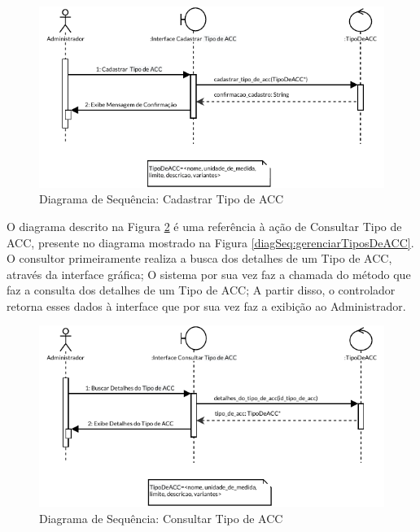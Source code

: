 \begin{figure}[H]
    \centering
    \includegraphics[width=\textwidth]{dados/figuras/Proposta/DiagramasDeSequencia/Gerenciar Tipos de ACC-Cadastrar Tipo de ACC.pdf}
    \caption{Diagrama de Sequência: Cadastrar Tipo de ACC}
    \label{diagSeq:cadastrarTipoDeACC}
\end{figure}

O diagrama descrito na Figura \ref{diagSeq:consultarTipoDeACC} é uma referência à ação de Consultar Tipo de ACC, presente no diagrama mostrado na Figura \ref{diagSeq:gerenciarTiposDeACC}. O consultor primeiramente realiza a busca dos detalhes de um Tipo de ACC, através da interface gráfica; O sistema por sua vez faz a chamada do método que faz a consulta dos detalhes de um Tipo de ACC; A partir disso, o controlador retorna esses dados à interface que por sua vez faz a exibição ao Administrador.

\begin{figure}[H]
    \centering
    \includegraphics[width=\textwidth]{dados/figuras/Proposta/DiagramasDeSequencia/Gerenciar Tipos de ACC-Consultar Tipo de ACC.pdf}
    \caption{Diagrama de Sequência: Consultar Tipo de ACC}
    \label{diagSeq:consultarTipoDeACC}
\end{figure}

